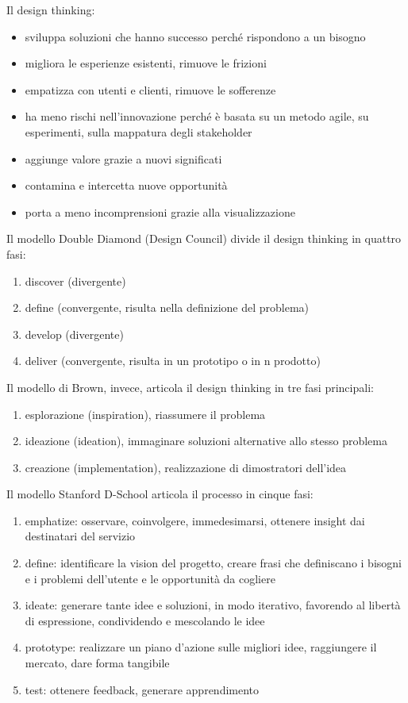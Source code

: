\documentclass[answers, a4paper, 11pt]{exam}
\begin{document}
Il design thinking:
\begin{itemize}
    \item sviluppa soluzioni che hanno successo perché rispondono a un bisogno
    \item migliora le esperienze esistenti, rimuove le frizioni
    \item empatizza con utenti e clienti, rimuove le sofferenze
    \item ha meno rischi nell'innovazione perché è basata su un metodo agile, su esperimenti, sulla mappatura degli stakeholder
    \item aggiunge valore grazie a nuovi significati
    \item contamina e intercetta nuove opportunità 
    \item porta a meno incomprensioni grazie alla visualizzazione
\end{itemize}
 
Il modello Double Diamond (Design Council) divide il design thinking in quattro fasi:
\begin{enumerate}
    \item discover (divergente)
    \item define (convergente, risulta nella definizione del problema)
    \item develop (divergente)
    \item deliver (convergente, risulta in un prototipo o in n prodotto)
\end{enumerate}
 
Il modello di Brown, invece, articola il design thinking in tre fasi principali:
\begin{enumerate}
    \item esplorazione (inspiration), riassumere il problema
    \item ideazione (ideation), immaginare soluzioni alternative allo stesso problema
    \item creazione (implementation), realizzazione di dimostratori dell'idea
\end{enumerate}

Il modello Stanford D-School articola il processo in cinque fasi:
\begin{enumerate}
    \item emphatize: osservare, coinvolgere, immedesimarsi, ottenere insight dai destinatari del servizio
    \item define: identificare la vision del progetto, creare frasi che definiscano i bisogni e i problemi dell'utente e le opportunità da cogliere
    \item ideate: generare tante idee e soluzioni, in modo iterativo, favorendo al libertà di espressione, condividendo e mescolando le idee
    \item prototype: realizzare un piano d'azione sulle migliori idee, raggiungere il mercato, dare forma tangibile
    \item test: ottenere feedback, generare apprendimento
\end{enumerate}
\end{document}
